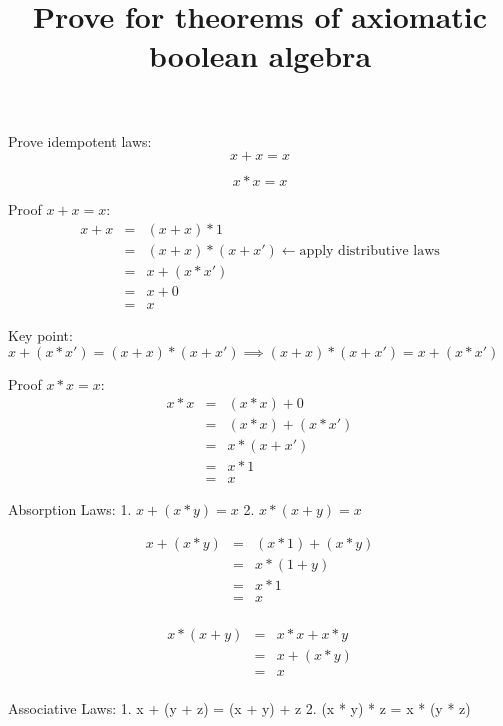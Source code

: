 \documentclass{article}
\begin{document}
\title{Prove for theorems of axiomatic boolean algebra}

Prove idempotent laws:
 \begin{equation}
 x + x = x
 \end{equation}

 \begin{equation}
 x * x = x
 \end{equation}

Proof $x + x = x$:
\begin{eqnarray*}
x + x & = & (x + x) * 1 \\
      & = & (x + x) * (x + x') \longleftarrow \text{apply distributive laws} \\
      & = & x + (x * x') \\
      & = & x + 0 \\
      & = & x
\end{eqnarray*}

Key point: $x + (x * x') = (x + x) * (x + x') \implies (x + x) * (x + x') = x + (x * x')$

Proof $x * x = x$:
\begin{eqnarray*}
x * x & = & (x * x) + 0 \\
      & = & (x * x) + (x * x') \\
      & = & x * (x + x') \\
      & = & x * 1 \\
      & = & x
\end{eqnarray*}

Absorption Laws: 1. $x + (x * y) = x$ 2. $x * (x + y) = x$

\begin{eqnarray*}
x + (x * y) & = & (x * 1) + (x * y) \\
            & = & x * (1 + y) \\
            & = & x * 1 \\
            & = & x \\
\end{eqnarray*}

\begin{eqnarray*}
x * (x + y) & = & x * x + x * y \\
            & = & x + (x * y) \\
            & = & x \\
\end{eqnarray*}


Associative Laws: 1. x + (y + z) = (x + y) + z 2. (x * y) * z = x * (y * z)
\end{document}
